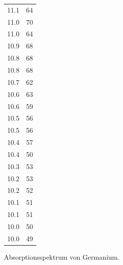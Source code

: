 \begin{figure}
{\begin{tabular}{c c}
    11.1 & 64 \\
    11.0 & 70 \\
    11.0 & 64 \\
    10.9 & 68 \\
    10.8 & 68 \\
    10.8 & 68 \\
    10.7 & 62 \\
    10.6 & 63 \\
    10.6 & 59 \\
    10.5 & 56 \\
    10.5 & 56 \\
    10.4 & 57 \\
    10.4 & 50 \\
    10.3 & 53 \\
    10.2 & 53 \\
    10.2 & 52 \\
    10.1 & 51 \\
    10.1 & 51 \\
    10.0 & 50 \\
    10.0 & 49 \\
    \bottomrule
  \end{tabular}
  }
  \caption{Absorptionsspektrum von Germanium.}
  \label{fig:3}
\end{figure}

